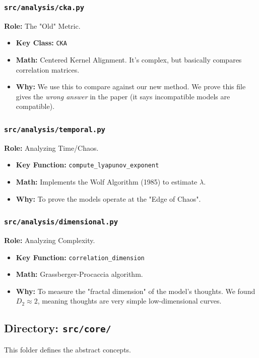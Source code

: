 \documentclass[11pt,a4paper]{article}
\begin{document}
\subsubsection{\texttt{src/analysis/cka.py}}
\textbf{Role:} The "Old" Metric.
\begin{itemize}
    \item \textbf{Key Class:} \texttt{CKA}
    \item \textbf{Math:} Centered Kernel Alignment. It's complex, but basically compares correlation matrices.
    \item \textbf{Why:} We use this to compare against our new method. We prove this file gives the \textit{wrong answer} in the paper (it says incompatible models are compatible).
\end{itemize}

\subsubsection{\texttt{src/analysis/temporal.py}}
\textbf{Role:} Analyzing Time/Chaos.
\begin{itemize}
    \item \textbf{Key Function:} \texttt{compute\_lyapunov\_exponent}
    \item \textbf{Math:} Implements the Wolf Algorithm (1985) to estimate $\lambda$.
    \item \textbf{Why:} To prove the models operate at the "Edge of Chaos".
\end{itemize}

\subsubsection{\texttt{src/analysis/dimensional.py}}
\textbf{Role:} Analyzing Complexity.
\begin{itemize}
    \item \textbf{Key Function:} \texttt{correlation\_dimension}
    \item \textbf{Math:} Grassberger-Procaccia algorithm.
    \item \textbf{Why:} To measure the "fractal dimension" of the model's thoughts. We found $D_2 \approx 2$, meaning thoughts are very simple low-dimensional curves.
\end{itemize}

\subsection{Directory: \texttt{src/core/}}
This folder defines the abstract concepts.
\end{document}

